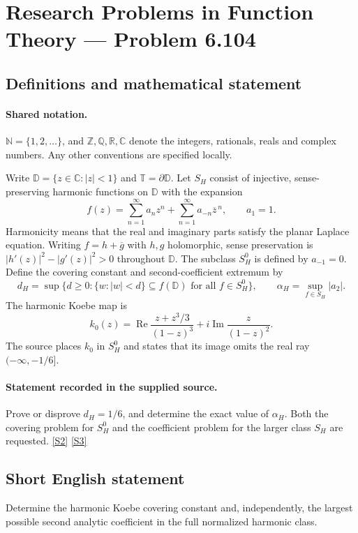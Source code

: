 \documentclass[11pt]{article}
\newcommand{\sref}[2]{\hyperlink{source:#1:#2}{[S#2]}}
\begin{document}
\section{Research Problems in Function Theory — Problem 6.104}\label{statement}

\subsection{Definitions and mathematical statement}

\paragraph{Shared notation.}$\mathbb N=\{1,2,\ldots\}$, and $\mathbb Z,\mathbb Q,\mathbb R,\mathbb C$ denote the integers, rationals, reals and complex numbers. Any other conventions are specified locally.


Write $\mathbb D=\{z\in\mathbb C:|z|<1\}$ and $\mathbb T=\partial\mathbb D$. Let $S_H$ consist of injective, sense-preserving harmonic functions on $\mathbb D$ with the expansion
\[f(z)=\sum_{n=1}^{\infty}a_nz^n+\sum_{n=1}^{\infty}a_{-n}\overline z^{\,n},\qquad a_1=1.\]
Harmonicity means that the real and imaginary parts satisfy the planar Laplace equation. Writing $f=h+\overline g$ with $h,g$ holomorphic, sense preservation is $|h'(z)|^2-|g'(z)|^2>0$ throughout $\mathbb D$. The subclass $S_H^0$ is defined by $a_{-1}=0$.
Define the covering constant and second-coefficient extremum by
\[d_H=\sup\{d\geq0:\{w:|w|<d\}\subseteq f(\mathbb D)\text{ for all }f\in S_H^0\},
\qquad \alpha_H=\sup_{f\in S_H}|a_2|.\]
The harmonic Koebe map is
\[k_0(z)=\operatorname{Re}\frac{z+z^3/3}{(1-z)^3}
+i\operatorname{Im}\frac{z}{(1-z)^2}.\]
The source places $k_0$ in $S_H^0$ and states that its image omits the real ray $(-\infty,-1/6]$.
\paragraph{Statement recorded in the supplied source.}
Prove or disprove $d_H=1/6$, and determine the exact value of $\alpha_H$. Both the covering problem for $S_H^0$ and the coefficient problem for the larger class $S_H$ are requested. \sref{statement}{2} \sref{statement}{3}
\subsection{Short English statement}
Determine the harmonic Koebe covering constant and, independently, the largest possible second analytic coefficient in the full normalized harmonic class.
\end{document}
